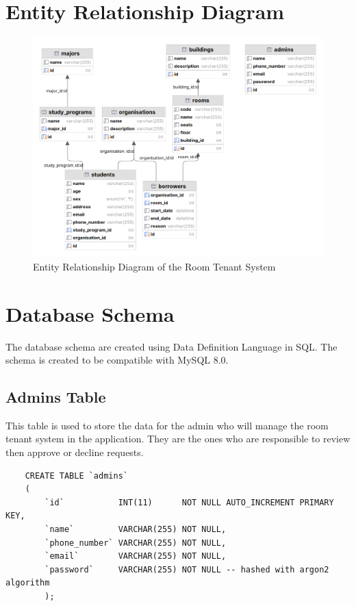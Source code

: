 \documentclass[12pt,titlepage]{article}
\begin{document}
\pagebreak

\section{Entity Relationship Diagram}
\begin{figure}[h]
    \centering
    \includegraphics[width=\textwidth]{./images/rts-erd.png}
    \caption{Entity Relationship Diagram of the Room Tenant System}
\end{figure}

\pagebreak

\section{Database Schema}
The database schema are created using Data Definition Language in SQL. 
The schema is created to be compatible with MySQL 8.0.

\subsection{Admins Table}
This table is used to store the data for the admin who will manage the room tenant system in the application.
They are the ones who are responsible to review then approve or decline requests.

\begin{verbatim}
    CREATE TABLE `admins`
    (
        `id`           INT(11)      NOT NULL AUTO_INCREMENT PRIMARY KEY,
        `name`         VARCHAR(255) NOT NULL,
        `phone_number` VARCHAR(255) NOT NULL,
        `email`        VARCHAR(255) NOT NULL,
        `password`     VARCHAR(255) NOT NULL -- hashed with argon2 algorithm
        );
    \end{verbatim}
    
\end{document}
